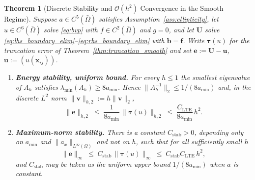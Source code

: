 \documentclass[11pt,a4paper]{article}
\newtheorem{theorem}{Theorem}[section]
\theoremstyle{definition}
\theoremstyle{remark}
\begin{document}
\begin{theorem}[Discrete Stability and $\mathcal{O}(h^2)$ Convergence in the Smooth Regime]
\label{thm:convergence}
Suppose $a\in C^5(\bar{\Omega})$ satisfies Assumption~\ref{ass:ellipticity}, let $u\in C^6(\bar{\Omega})$ solve \eqref{eq:bvp} with $f\in C^2(\bar{\Omega})$ and $g=0$, and let $\bm{U}$ solve \eqref{eq:lhs_boundary_elim}--\eqref{eq:rhs_boundary_elim} with $\bm{b}=\bm{f}$. Write $\bm{\tau}(u)$ for the truncation error of Theorem~\ref{thm:truncation_smooth} and set $\bm{e}:=\bm{U}-\bm{u}$, $\bm{u}:=(u(\bm{x}_{ij}))$.
\begin{enumerate}[label=(\roman*), leftmargin=2em, itemsep=2pt]
    \item \textbf{Energy stability, uniform bound.} For every $h\le1$ the smallest eigenvalue of $A_h$ satisfies $\lambda_{\min}(A_h)\ge 8a_{\min}$. Hence $\|A_h^{-1}\|_2\le 1/(8a_{\min})$ and, in the discrete $L^2$ norm $\|\bm{v}\|_{h,2}:=h\|\bm{v}\|_2$,
    \begin{equation}
        \|\bm{e}\|_{h,2} \;\le\; \frac{1}{8a_{\min}}\,\|\bm{\tau}(u)\|_{h,2} \;\le\; \frac{C_{\text{LTE}}}{8a_{\min}}\,h^2 .
        \label{eq:conv_bound_l2}
    \end{equation}
    \item \textbf{Maximum-norm stability.} There is a constant $C_{\text{stab}}>0$, depending only on $a_{\min}$ and $\|a_x\|_{L^\infty(\Omega)}$ and not on $h$, such that for all sufficiently small $h$
    \begin{equation}
        \|\bm{e}\|_\infty \;\le\; C_{\text{stab}}\,\|\bm{\tau}(u)\|_\infty \;\le\; C_{\text{stab}}C_{\text{LTE}}\,h^2 ,
        \label{eq:conv_bound_linf}
    \end{equation}
    and $C_{\text{stab}}$ may be taken as the uniform upper bound $1/(8a_{\min})$ when $a$ is constant.
\end{enumerate}
\end{theorem}
\end{document}

